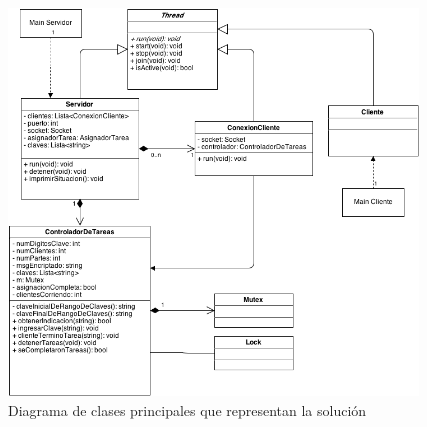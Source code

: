 \documentclass{article}
\begin{document}
\newpage
\begin{figure}[h]
	\centering
	\includegraphics[width=0.968976\textwidth]{images/diagrama_clases.png}
	\medskip
	\caption{Diagrama de clases principales que representan la solución}
\end{figure}
\bigskip
\end{document}
